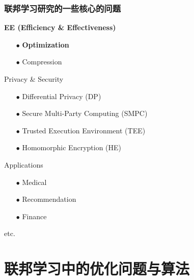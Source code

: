 \begin{frame}
\frametitle{联邦学习研究的一些核心的问题}

\begin{itemize}
    \item {\Large\bfseries EE (Efficiency \& Effectiveness)}
    \begin{itemize}
        \item[$\bullet$] {\large\bfseries Optimization}
        \vspace{0.5em}
        \item[$\bullet$] Compression
        \pause
        { \footnotesize
        }
    \end{itemize}
    \vspace{0.6em}
    { \footnotesize
    \item Privacy \& Security
    \begin{itemize}
        \item[$\bullet$] Differential Privacy (DP)
        \item[$\bullet$] Secure Multi-Party Computing (SMPC)
        \item[$\bullet$] Trusted Execution Environment (TEE)
        \item[$\bullet$] Homomorphic Encryption (HE)
    \end{itemize}
    \item Applications
    \begin{itemize}
        \item[$\bullet$] Medical
        \item[$\bullet$] Recommendation
        \item[$\bullet$] Finance
    \end{itemize}
    \item etc.
    }
\end{itemize}

\end{frame}


\section[Optim in FL]{联邦学习中的优化问题与算法}


